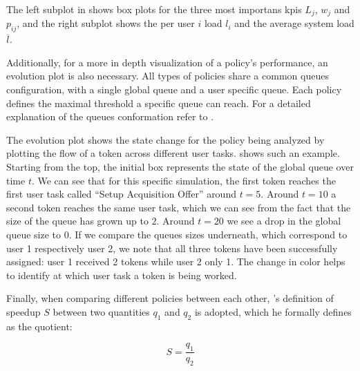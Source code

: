 
The left subplot in  shows box plots for the three most importans \glspl{kpi} \ie $L_j$, $w_j$ and $p_{ij}$, and the right subplot shows the per user $i$ load $l_i$ and the average system load $\overline{l}$.

Additionally, for a more in depth visualization of a policy's performance, an evolution plot is also necessary. All types of policies share a common queues configuration, with a single global queue and a user specific queue. Each policy defines the maximal threshold a specific queue can reach. For a detailed explanation of the queues conformation refer to .

The evolution plot shows the state change for the policy being analyzed by plotting the flow of a token across different user tasks.  shows such an example. Starting from the top, the initial box represents the state of the global queue over time $t$. We can see that for this specific simulation, the first token reaches the first user task called ``Setup Acquisition Offer'' around $t=5$. Around $t=10$ a second token reaches the same user task, which we can see from the fact that the size of the queue has grown up to $2$. Around $t=20$ we see a drop in the global queue size to $0$. If we compare the queues sizes underneath, which correspond to user 1 respectively user 2, we note that all three tokens have been successfully assigned: user 1 received 2 tokens while user 2 only 1. The change in color helps to identify at which user task a token is being worked.


Finally, when comparing different policies between each other, \citet{Milo2012}'s definition of speedup $S$ between two quantities $q_1$ and $q_2$ is adopted, which he formally defines as the quotient: 

\begin{equation}
	S=\frac{q_1}{q_2}
\end{equation}
